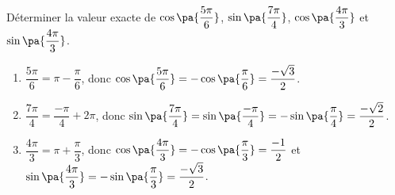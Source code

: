 \begin{methode}
	Déterminer la valeur exacte de $\cos\pa{\dfrac{5\pi}{6}}$, $\sin\pa{\dfrac{7\pi}{4}}$, $\cos\pa{\dfrac{4\pi}{3}}$ et $\sin\pa{\dfrac{4\pi}{3}}$.

	\begin{correction}
		\nline
		\begin{enumerate}
			\item $\dfrac{5\pi}{6} = \pi - \dfrac{\pi}{6}$, donc $\cos\pa{\dfrac{5\pi}{6}} = -\cos\pa{\dfrac{\pi}{6}} = \dfrac{-\sqrt{3}}{2}$.
			\item $\dfrac{7\pi}{4} = \dfrac{-\pi}{4} + 2\pi$, donc $\sin\pa{\dfrac{7\pi}{4}} = \sin\pa{\dfrac{-\pi}{4}} = -\sin\pa{\dfrac{\pi}{4}} = \dfrac{-\sqrt{2}}{2}$.
			\item $\dfrac{4\pi}{3} = \pi + \dfrac{\pi}{3}$, donc $\cos\pa{\dfrac{4\pi}{3}} = -\cos\pa{\dfrac{\pi}{3}} = \dfrac{-1}{2}$ et $\sin\pa{\dfrac{4\pi}{3}} = -\sin\pa{\dfrac{\pi}{3}} = \dfrac{-\sqrt{3}}{2}$.
		\end{enumerate}
	\end{correction}


\end{methode}
